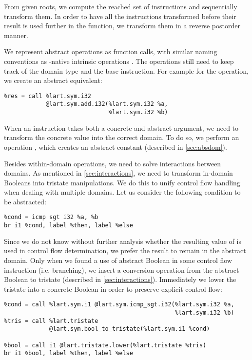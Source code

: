 From given roots, we compute the reached set of instructions and sequentially
transform them. In order to have all the instructions transformed before their
result is used further in the function, we transform them in a reverse postorder manner.

We represent abstract operations as function calls, with similar naming
conventions as \LLVM-native intrinsic operations \cite{LLVM:langref}. The
operations still need to keep track of the domain type and the base \LLVM instruction.
For example for the  operation, we create an abstract equivalent:
\begin{verbatim}
%res = call %lart.sym.i32
            @lart.sym.add.i32(%lart.sym.i32 %a,
                              %lart.sym.i32 %b)
\end{verbatim}

When an instruction takes both a concrete and abstract argument, we need to
transform the concrete value into the correct domain. To do so, we perform an
operation , which creates an abstract constant (described in
\autoref{sec:absdom}).

Besides within-domain operations, we need to solve interactions between domains.
As mentioned in \autoref{sec:interactions}, we need to transform in-domain
Booleans into tristate manipulations. We do this to unify control flow
handling when dealing with multiple domains. Let us consider the following
condition to be abstracted:
\begin{verbatim}
%cond = icmp sgt i32 %a, %b
br i1 %cond, label %then, label %else
\end{verbatim}
Since we do not know without further analysis whether the resulting value of
 is used in control flow determination, we prefer the result to
remain in the abstract domain. Only when we found a use of abstract Boolean in
some control flow instruction (i.e. branching), we insert a conversion operation
from the abstract Boolean to tristate (described in \autoref{sec:interactions}).
Immediately we lower the tristate into a concrete Boolean in order to preserve
explicit control flow:
\begin{verbatim}
%cond = call %lart.sym.i1 @lart.sym.icmp_sgt.i32(%lart.sym.i32 %a,
                                                 %lart.sym.i32 %b)
%tris = call %lart.tristate
             @lart.sym.bool_to_tristate(%lart.sym.i1 %cond)

%bool = call i1 @lart.tristate.lower(%lart.tristate %tris)
br i1 %bool, label %then, label %else
\end{verbatim}

